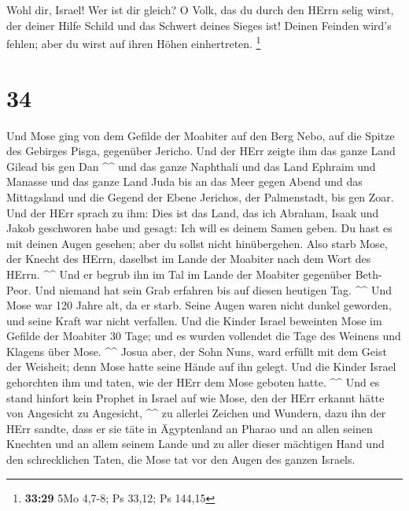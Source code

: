  Wohl dir, Israel! Wer ist dir gleich? O Volk, das du
durch den HErrn selig wirst, der deiner Hilfe Schild und das Schwert
deines Sieges ist! Deinen Feinden wird's fehlen; aber du wirst auf ihren
Höhen einhertreten. \footnote{\textbf{33:29} 5Mo 4,7-8; Ps 33,12; Ps
  144,15}

\hypertarget{section-33}{%
\section{34}\label{section-33}}

 Und Mose ging von dem Gefilde der Moabiter auf den Berg
Nebo, auf die Spitze des Gebirges Pisga, gegenüber Jericho. Und der HErr
zeigte ihm das ganze Land Gilead bis gen Dan \^{}\^{}  und
das ganze Naphthali und das Land Ephraim und Manasse und das ganze Land
Juda bis an das Meer gegen Abend  und das Mittagsland und
die Gegend der Ebene Jerichos, der Palmenstadt, bis gen Zoar.
 Und der HErr sprach zu ihm: Dies ist das Land, das ich
Abraham, Isaak und Jakob geschworen habe und gesagt: Ich will es deinem
Samen geben. Du hast es mit deinen Augen gesehen; aber du sollst nicht
hinübergehen.  Also starb Mose, der Knecht des HErrn,
daselbst im Lande der Moabiter nach dem Wort des HErrn. \^{}\^{}
 Und er begrub ihn im Tal im Lande der Moabiter gegenüber
Beth-Peor. Und niemand hat sein Grab erfahren bis auf diesen heutigen
Tag. \^{}\^{}  Und Mose war 120 Jahre alt, da er starb.
Seine Augen waren nicht dunkel geworden, und seine Kraft war nicht
verfallen.  Und die Kinder Israel beweinten Mose im
Gefilde der Moabiter 30 Tage; und es wurden vollendet die Tage des
Weinens und Klagens über Mose. \^{}\^{}  Josua aber, der
Sohn Nuns, ward erfüllt mit dem Geist der Weisheit; denn Mose hatte
seine Hände auf ihn gelegt. Und die Kinder Israel gehorchten ihm und
taten, wie der HErr dem Mose geboten hatte. \^{}\^{}  Und
es stand hinfort kein Prophet in Israel auf wie Mose, den der HErr
erkannt hätte von Angesicht zu Angesicht, \^{}\^{}  zu
allerlei Zeichen und Wundern, dazu ihn der HErr sandte, dass er sie täte
in Ägyptenland an Pharao und an allen seinen Knechten und an allem
seinem Lande  und zu aller dieser mächtigen Hand und den
schrecklichen Taten, die Mose tat vor den Augen des ganzen Israels.
